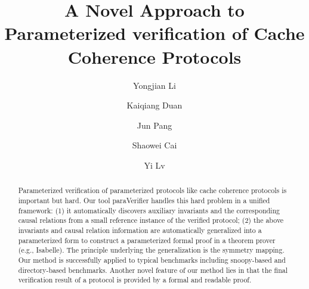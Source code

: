 \documentclass{llncs}
\begin{document}
\title{ {\sf A Novel Approach to Parameterized verification of Cache Coherence Protocols}}
\author{Yongjian Li  \and
        Kaiqiang Duan  \and
        Jun Pang  \and
        Shaowei Cai  \and
        Yi Lv  }

\maketitle
\vspace{-0.5cm}
\begin{abstract}
Parameterized verification of parameterized protocols like cache coherence protocols is important
but hard.   Our tool {\sf paraVerifier} handles this hard problem in
a unified framework: (1) it automatically  discovers auxiliary invariants and the
corresponding causal relations %
 from a small reference instance of the verified protocol; (2) the above
invariants and causal relation information  are automatically generalized into a parameterized
form to construct a parameterized formal proof in a theorem prover
(e.g., Isabelle). The principle underlying the generalization is the
symmetry mapping. Our method is successfully applied to typical
benchmarks including  snoopy-based and directory-based benchmarks. Another novel
feature of our method lies in that the final verification result of a
protocol is provided by a formal and readable proof.%

\end{abstract}

\vspace{-0.5cm}
\end{document}
